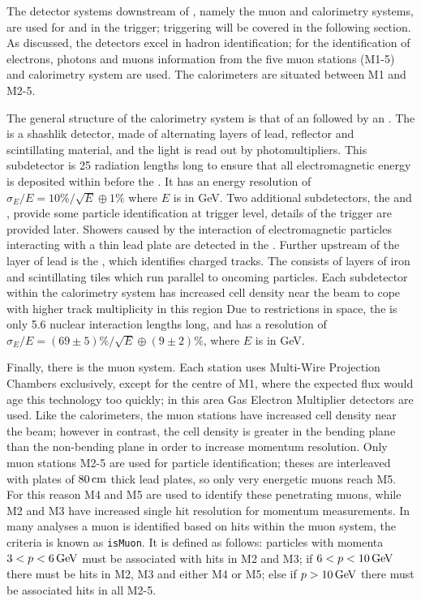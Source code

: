 The detector systems downstream of \richtwo, namely the muon and calorimetry systems, are used for
\pid and in the trigger; triggering will be covered in the following section.
As discussed, the \rich detectors excel in hadron identification; for the identification of
electrons, photons and muons information from the five muon stations (M1-5) and calorimetry system
are used.
The calorimeters are situated between M1 and M2-5.

The general structure of the calorimetry system is that of an \ecal followed by an \hcal.
The \ecal is a shashlik detector, made of alternating layers of lead, reflector and scintillating
material, and the light is read out by photomultipliers.
This subdetector is 25 radiation lengths long to ensure that all electromagnetic energy is
deposited within before the \hcal.
It has an energy resolution of $\sigma_E/E = 10\%/\sqrt{E} \oplus 1\%$ where $E$ is in GeV.
Two additional subdetectors, the \spd and \presh, provide some particle identification at trigger
level, details of the trigger are provided later.
Showers caused by the interaction of electromagnetic particles interacting with a thin lead plate
are detected in the \presh.
Further upstream of the layer of lead is the \spd, which identifies charged tracks.
The \hcal consists of layers of iron and scintillating tiles which run parallel to oncoming
particles.
Each subdetector within the calorimetry system has increased cell density near the beam to cope
with higher track multiplicity in this region
Due to restrictions in space, the \hcal is only 5.6 nuclear interaction lengths long, and has a
resolution of $\sigma_E/E = (69\pm5)\%/\sqrt{E} \oplus (9\pm2)\%$, where $E$ is in GeV.


Finally, there is the muon system.
Each station uses Multi-Wire Projection Chambers exclusively, except for the centre of M1, where
the expected flux would age this technology too quickly; in this area Gas Electron Multiplier
detectors are used.
Like the calorimeters, the muon stations have increased cell density near the beam; however in
contrast, the cell density is greater in the bending plane than the non-bending plane in order to
increase momentum resolution.
Only muon stations M2-5 are used for particle identification; theses are interleaved with plates of
$80\rm \,cm$ thick lead plates, so only very energetic muons reach M5.
For this reason M4 and M5 are used to identify these penetrating muons, while M2 and M3 have
increased single hit resolution for momentum measurements.
In many \lhcb analyses a muon is identified based on hits within the muon system, the criteria is
known as {\tt isMuon}.
It is defined as follows: particles with momenta $3<p<6\mathrm{\,Ge\kern -0.1em V}$ must be associated with hits in M2 and M3; if
$6<p<10\mathrm{\,Ge\kern -0.1em V}$ there must be hits in M2, M3 and either M4 or M5; else if $p>10\mathrm{\,Ge\kern -0.1em V}$ there must be
associated hits in all M2-5.


